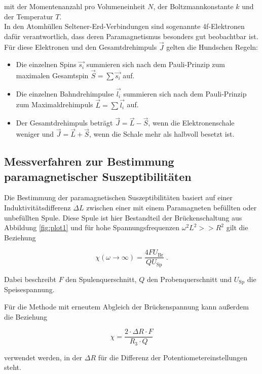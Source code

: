 mit der Momentenanzahl pro Volumeneinheit $N$, der Boltzmannkonstante $k$ und der
Temperatur $T$.\\

In den Atomhüllen Seltener-Erd-Verbindungen sind sogenannte 4f-Elektronen dafür verantwortlich,
dass deren Paramagnetismus besonders gut beobachtbar ist. Für diese Elektronen und
den Gesamtdrehimpuls $\vec{J}$ gelten die Hundschen Regeln:

\begin{itemize}
    \item Die einzelnen Spins $\vec{s_i}$ summieren sich nach dem Pauli-Prinzip zum maximalen Gesamtspin
    $\vec{S} = \sum \vec{s_i}$ auf.
    \item Die einzelnen Bahndrehimpulse $\vec{l_i}$ summieren sich nach dem Pauli-Prinzip zum Maximaldrehimpuls 
    $\vec{L} = \sum \vec{l_i}$ auf.
    \item Der Gesamtdrehimpuls beträgt $\vec{J} = \vec{L} - \vec{S}$, wenn die Elektronenschale weniger und
    $\vec{J} = \vec{L} + \vec{S}$, wenn die Schale mehr als halbvoll besetzt ist.
\end{itemize}

\subsection{Messverfahren zur Bestimmung paramagnetischer Suszeptibilitäten}

Die Bestimmung der paramagnetischen Suszeptibilitäten basiert auf einer
Induktivitätsdifferenz $\Delta L$ zwischen einer mit einem Paramagneten 
befüllten oder unbefüllten Spule. Diese Spule ist hier Bestandteil der
Brückenschaltung aus Abbildung \ref{fig:plot1} und für hohe Spannungsfrequenzen
$\omega^2 L^2 >> R^2$ gilt die Beziehung 

\begin{equation}
    \chi (\omega \to \infty) = \frac{4 F U_\text{Br}}{Q U_\text{Sp}} \; .
    \label{eqn:spannung}
\end{equation} 

Dabei beschreibt $F$ den Spulenquerschnitt, $Q$ den Probenquerschnitt und
$U_\text{Sp}$ die Speisespannung.

Für die Methode mit erneutem Abgleich der Brückenspannung 
kann außerdem die Beziehung 

\begin{equation}
    \chi = \frac{2 \cdot \Delta R \cdot F}{R_3\cdot Q}
    \label{eqn:alternativ}
\end{equation}

verwendet werden, in der $\Delta R$ für die Differenz der Potentiometereinstellungen
steht.


















